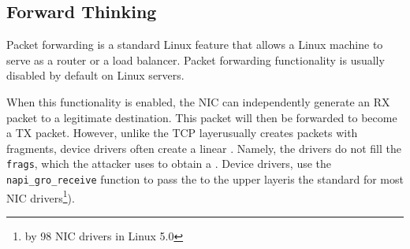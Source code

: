 




\subsection{Forward Thinking \Compound \DIFdelbegin {}\DIFdelend \DIFaddbegin {}\DIFaddend }\label{appx:additional_compound}


Packet forwarding is a standard Linux feature that allows a Linux machine to serve as a router or a load balancer. Packet forwarding functionality is usually disabled by default on Linux servers.

When this functionality is enabled, the NIC can independently generate an RX packet to a legitimate destination. This packet will then be forwarded to become a TX packet. However, unlike \DIFdelbegin {}\DIFdelend the TCP layer\DIFdelbegin {}\DIFdelend \DIFaddbegin {}\DIFaddend usually creates \skb{} packets with fragments, device drivers often create a linear \skb{}. Namely, the drivers do not fill the \texttt{frags}, which the attacker uses to obtain a \kva. Device drivers, use the \DIFdelbegin %
\DIFdelend \texttt{napi\_gro\_receive} function to pass the \skb{} to the upper layer\DIFdelbegin {}\DIFdelend \DIFaddbegin {}\DIFaddend is the standard for most NIC drivers\footnote{\DIFdelbegin {}\DIFdelend \DIFaddbegin {}\DIFaddend by 98 NIC drivers \DIFdelbegin \DIFdel{, }\DIFdelend in Linux 5.0}). 

